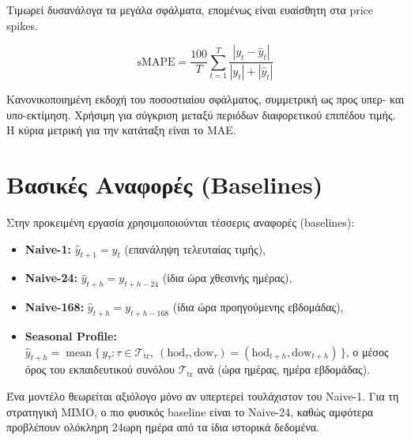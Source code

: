 Τιμωρεί δυσανάλογα τα μεγάλα σφάλματα, επομένως είναι ευαίσθητη στα price spikes.

\begin{equation}
  \mathrm{sMAPE} = \frac{100}{T}\sum_{t=1}^{T}\frac{|y_t - \hat{y}_t|}{|y_t| + |\hat{y}_t|}
  \label{eq:smape}
\end{equation}

Κανονικοποιημένη εκδοχή του ποσοστιαίου σφάλματος, συμμετρική ως προς υπερ- και
υπο-εκτίμηση. Χρήσιμη για σύγκριση μεταξύ περιόδων διαφορετικού επιπέδου τιμής. Η
κύρια μετρική για την κατάταξη είναι το MAE.


\section{Βασικές Αναφορές (Baselines)}
\label{sec:baselines}

Στην προκειμένη εργασία χρησιμοποιούνται τέσσερις αναφορές (baselines):

\begin{itemize}
  \item \textbf{Naive-1:} $\hat{y}_{t+1} = y_t$ (επανάληψη τελευταίας τιμής),
  \item \textbf{Naive-24:} $\hat{y}_{t+h} = y_{t+h-24}$ (ίδια ώρα χθεσινής ημέρας),
  \item \textbf{Naive-168:} $\hat{y}_{t+h} = y_{t+h-168}$ (ίδια ώρα προηγούμενης εβδομάδας),
  \item \textbf{Seasonal Profile:} $\hat{y}_{t+h} = \operatorname{mean}\{\, y_\tau : \tau \in \mathcal{T}_{\mathrm{tr}},\ (\mathrm{hod}_\tau, \mathrm{dow}_\tau) = (\mathrm{hod}_{t+h}, \mathrm{dow}_{t+h}) \,\}$, ο μέσος όρος του εκπαιδευτικού συνόλου $\mathcal{T}_{\mathrm{tr}}$ ανά (ώρα ημέρας, ημέρα εβδομάδας).
\end{itemize}

Ένα μοντέλο θεωρείται αξιόλογο μόνο αν υπερτερεί τουλάχιστον του Naive-1. Για τη
στρατηγική MIMO, ο πιο φυσικός baseline είναι το Naive-24, καθώς αμφότερα προβλέπουν
ολόκληρη 24ωρη ημέρα από τα ίδια ιστορικά δεδομένα.
